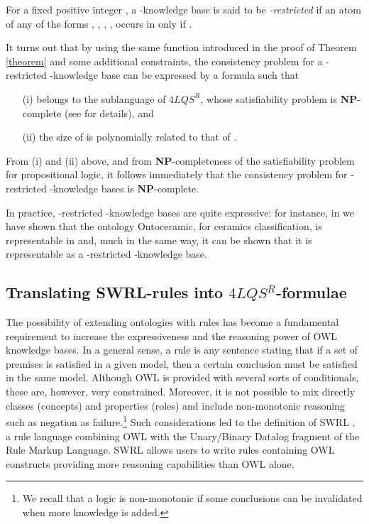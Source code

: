 \documentclass[a4paper]{llncs}
\newcommand{\flqsr}{\ensuremath{4LQS^R}}
\begin{document}
\begin{remark}
For a fixed positive integer , a -knowledge base  is said to be \emph{-restricted} if an atom of any of the forms , , , ,  occurs in  only if .

It turns out that by using the same function
 introduced in the proof of Theorem \ref{theorem} and some additional constraints, the consistency problem for a -restricted -knowledge base  can be expressed by a formula  such that
\begin{itemize}
\item[(i)]  belongs to the sublanguage  of \flqsr, whose satisfiability problem is \textbf{NP}-complete (see \cite{CanNic2013} for details), and

\item[(ii)] the size of  is polynomially related to that of .
\end{itemize}
From (i) and (ii) above, and from \textbf{NP}-completeness of the satisfiability problem for propositional logic, it follows immediately that the consistency problem for -restricted -knowledge bases is \textbf{NP}-complete.

In practice, -restricted -knowledge bases are quite expressive: for instance, in \cite{santaLAP} we have shown that the ontology \textsf{Ontoceramic}, for ceramics classification, is representable in  and, much in the same way, it can be shown that it is representable as a -restricted -knowledge base.
\end{remark}








\subsection{Translating SWRL-rules into \flqsr-formulae}\label{rules}
The possibility of extending ontologies with rules has become a fundamental requirement to increase the expressiveness and the reasoning power of OWL knowledge bases. In a general sense, a rule is any sentence stating that if a set of premises is satisfied in a given model, then a certain conclusion must be satisfied in the same model. Although OWL is provided with several sorts of conditionals, these are, however, very constrained. Moreover, it is not possible to mix directly classes (concepts) and properties (roles)  and include non-monotonic reasoning such as negation as failure.\footnote{We recall that a logic is non-monotonic if some conclusions can be invalidated when more knowledge is added.}
Such considerations led to the definition of SWRL \cite{swrl}, a rule language combining OWL with the Unary/Binary Datalog fragment of the Rule Markup Language. SWRL allows users to write rules containing OWL constructs providing more reasoning capabilities than OWL alone.
\end{document}
